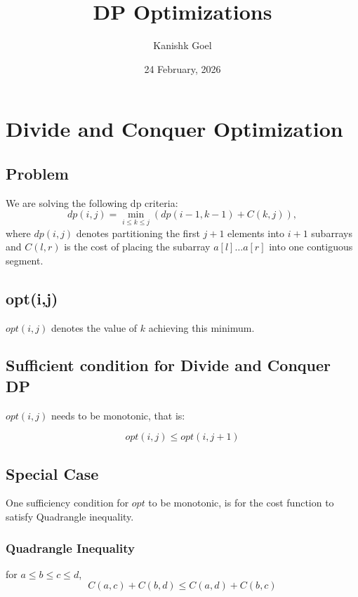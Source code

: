 \documentclass{article}
\title{DP Optimizations}
\author{Kanishk Goel}
\date{24 February, 2026}
\begin{document}
	\SetAlgoCaptionSeparator{}
	\renewcommand{\thealgocf}{} 
	\renewcommand{\AlCapNameFnt}{\bfseries}
	\renewcommand{\AlCapFnt}{}
	\DontPrintSemicolon
	\renewcommand{\algorithmcfname}{}
	\maketitle
	\SetAlgoNoEnd
	
	\section{Divide and Conquer Optimization}
	\subsection{Problem}
	We are solving the following dp criteria:
	\[
	dp(i,j) = \underset{i \leq k \leq j}{\min} (dp(i-1,k-1) + C(k,j)),
	\]
	where $dp(i,j)$ denotes partitioning the first $j+1$ elements into $i+1$ subarrays and $C(l,r)$ is the cost of placing the subarray $a[l] \ldots a[r]$ into one contiguous segment.
	
	\subsection{opt(i,j)}
	$opt(i,j)$ denotes the value of $k$ achieving this minimum. 
	
	\subsection{Sufficient condition for Divide and Conquer DP}
	
	$opt(i,j)$ needs to be monotonic, that is:
	
	\[
	opt(i,j) \leq opt(i,j+1)
	\]
	
	\subsection{Special Case}
	One sufficiency condition for $opt$ to be monotonic, is for the cost function to satisfy Quadrangle inequality.
	
	\subsubsection{Quadrangle Inequality}
	for $a \leq b \leq c \leq d$,
	\[
	C(a,c) + C(b,d) \leq C(a,d) + C(b,c)
	\]
	
\end{document}
